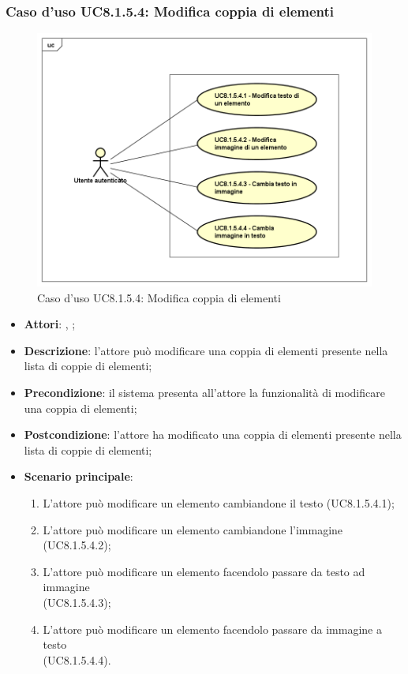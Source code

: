 	\subsubsection{Caso d'uso UC8.1.5.4: Modifica coppia di elementi}
	\label{UC8.1.5.4}
	\begin{figure}[h]
		\centering
		\includegraphics[scale=0.5,keepaspectratio]{UML/UC8_1_5_4.png}
		\caption{Caso d'uso UC8.1.5.4: Modifica coppia di elementi}
	\end{figure}
	\FloatBarrier
	\begin{itemize}
		\item \textbf{Attori}: \uau, \uaupro;
		\item \textbf{Descrizione}: l'attore può modificare una coppia di elementi presente nella lista di coppie di elementi;
		\item \textbf{Precondizione}: il sistema presenta all'attore la funzionalità di modificare una coppia di elementi;
		\item \textbf{Postcondizione}: l'attore ha modificato una coppia di elementi presente nella lista di coppie di elementi; 
		\item \textbf{Scenario principale}: 
		\begin{enumerate}
			\item L'attore può modificare un elemento cambiandone il testo (UC8.1.5.4.1);
			\item L'attore può modificare un elemento cambiandone l'immagine (UC8.1.5.4.2);
			\item L'attore può modificare un elemento facendolo passare da testo ad immagine \\(UC8.1.5.4.3);
			\item L'attore può modificare un elemento facendolo passare da immagine a testo \\(UC8.1.5.4.4).	
		\end{enumerate}
	\end{itemize}
	
